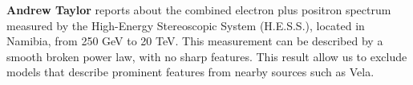 \documentclass{PoS}
\begin{document}
{\bf Andrew Taylor} reports about the combined electron plus positron spectrum  measured by the High-Energy Stereoscopic System (H.E.S.S.), located in Namibia, from 250 GeV to 20 TeV. This measurement can be described by a smooth broken power law, with no sharp features. This result allow us to exclude models that describe prominent features from nearby sources such as Vela.





















\end{document}
